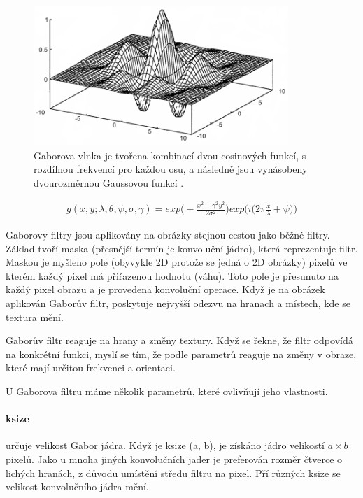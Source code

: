 \documentclass[czech,BP]{thesiskiv}
\begin{document}
\begin{figure}[H]
		\centering
		\includegraphics[height=200px]{./img/gabor.png}
		\caption{Gaborova vlnka je tvořena kombinací dvou cosinových funkcí, s rozdílnou frekvencí pro každou osu, a následně jsou vynásobeny dvourozměrnou Gaussovou funkcí \cite{Gabor}.} 					
\end{figure}

\begin{align}
   \label{gabor_complex}  g(x, y; \lambda, \theta, \psi, \sigma,  \gamma) = exp \Bigg( - \frac{{x^2 + \gamma^2 y^2}}{2 \sigma^2} \Bigg) exp \Bigg(i \bigg(2\pi \frac{x}{\lambda} + \psi \bigg)\Bigg)  
\end{align}

\par Gaborovy filtry jsou aplikovány na obrázky stejnou cestou jako běžné filtry. Základ tvoří maska (přesnější termín je konvoluční jádro), která reprezentuje filtr. Maskou je myšleno pole (obyvykle 2D protože se jedná o 2D obrázky) pixelů ve kterém každý pixel má přiřazenou hodnotu (váhu). Toto pole je přesunuto na každý pixel obrazu a je provedena konvoluční operace. Když je na obrázek aplikován Gaborův filtr, poskytuje nejvyšší odezvu na hranach a místech, kde se textura mění. \cite{Gabor_wordpress}

\par Gaborův filtr reaguje na hrany a změny textury. Když se řekne, že filtr odpovídá na konkrétní funkci, myslí se tím, že podle parametrů reaguje na změny v obraze, které mají určitou frekvenci a orientaci. 

U Gaborova filtru máme několik parametrů, které ovlivňují jeho vlastnosti. 
\paragraph{ksize} určuje velikost Gabor jádra. Když je ksize (a, b), je získáno jádro velikostí $a \times b$ pixelů. Jako u mnoha jiných konvolučních jader je preferován rozměr čtverce o lichých hranách, z důvodu umístění středu filtru na pixel. Pří různých ksize se velikost konvolučního jádra mění. 
\end{document}
